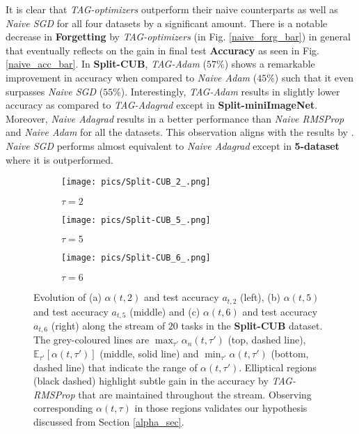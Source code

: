 \documentclass{article} \usepackage{collas2022_conference,times}
\begin{document}
    It is clear that \textit{TAG-optimizers} outperform their naive counterparts as well as \textit{Naive SGD} for all four datasets by a significant amount. There is a notable decrease in \textbf{Forgetting} by \textit{TAG-optimizers} (in Fig. \ref{naive_forg_bar}) in general that eventually reflects on the gain in final test \textbf{Accuracy} as seen in Fig. \ref{naive_acc_bar}. In \textbf{Split-CUB}, \textit{TAG-Adam} ($57\%$) shows a remarkable improvement in accuracy when compared to \textit{Naive Adam} ($45\%$) such that it even surpasses \textit{Naive SGD} ($55\%$). Interestingly, \textit{TAG-Adam} results in slightly lower accuracy as compared to \textit{TAG-Adagrad} except in \textbf{Split-miniImageNet}. Moreover, \textit{Naive Adagrad} results in a better performance than \textit{Naive RMSProp} and \textit{Naive Adam} for all the datasets. This observation aligns with the results by \citet{hsu2018re}. \textit{Naive SGD} performs almost equivalent to \textit{Naive Adagrad} except in \textbf{5-dataset} where it is outperformed.
    





\begin{figure*}[h!]
        \centering
        \begin{subfigure}[b]{0.28\textwidth}
            \texttt{[image: pics/Split-CUB\_2\_.png]}
            \caption{$\tau=2$}\label{t2}
        \end{subfigure}
        \hfill
        \begin{subfigure}[b]{0.28\textwidth}
            \texttt{[image: pics/Split-CUB\_5\_.png]}
            \caption{$\tau=5$}\label{t5}
        \end{subfigure}
        \hfill
        \begin{subfigure}[b]{0.28\textwidth}
            \texttt{[image: pics/Split-CUB\_6\_.png]}
            \caption{$\tau=6$}\label{t6}
        \end{subfigure}
\caption{Evolution of (a) $\alpha(t,2)$ and test accuracy $a_{t,2}$ (left), (b) $\alpha(t,5)$ and test accuracy $a_{t,5}$ (middle) and (c) $\alpha(t,6)$ and test accuracy $a_{t,6}$ (right) along the stream of $20$ tasks in the \textbf{Split-CUB} dataset. The grey-coloured lines are $\max_{\tau'} \alpha_n(t,\tau')$ (top, dashed line), $\mathbb{E}_{\tau'} [\alpha(t,\tau')]$ (middle, solid line) and $\min_{\tau'} \alpha(t,\tau')$ (bottom, dashed line) that indicate the range of $\alpha(t,\tau')$. Elliptical regions (black dashed) highlight subtle gain in the accuracy by \textit{TAG-RMSProp} that are maintained throughout the stream. Observing corresponding $\alpha(t,\tau)$ in those regions validates our hypothesis discussed from Section \ref{alpha_sec}.}
        \label{alpha_fig}
    \end{figure*}
\end{document}
